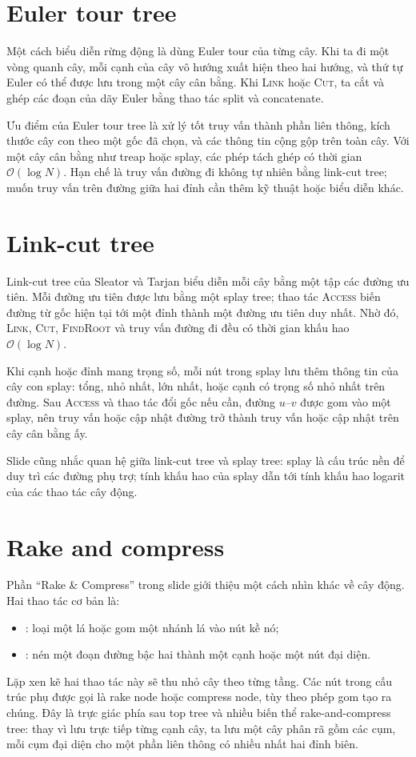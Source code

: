 \documentclass[11pt]{article}
\newcommand{\Oh}{\mathcal{O}}
\begin{document}
\section{Euler tour tree}

Một cách biểu diễn rừng động là dùng Euler tour của từng cây. Khi ta đi một
vòng quanh cây, mỗi cạnh của cây vô hướng xuất hiện theo hai hướng, và thứ tự
Euler có thể được lưu trong một cây cân bằng. Khi \textsc{Link} hoặc
\textsc{Cut}, ta cắt và ghép các đoạn của dãy Euler bằng thao tác split và
concatenate.

Ưu điểm của Euler tour tree là xử lý tốt truy vấn thành phần liên thông,
kích thước cây con theo một gốc đã chọn, và các thông tin cộng gộp trên toàn
cây. Với một cây cân bằng như treap hoặc splay, các phép tách ghép có thời
gian \(\Oh(\log N)\). Hạn chế là truy vấn đường đi không tự nhiên bằng
link-cut tree; muốn truy vấn trên đường giữa hai đỉnh cần thêm kỹ thuật hoặc
biểu diễn khác.

\section{Link-cut tree}

Link-cut tree của Sleator và Tarjan biểu diễn mỗi cây bằng một tập các đường
ưu tiên. Mỗi đường ưu tiên được lưu bằng một splay tree; thao tác
\textsc{Access} biến đường từ gốc hiện tại tới một đỉnh thành một đường ưu
tiên duy nhất. Nhờ đó, \textsc{Link}, \textsc{Cut}, \textsc{FindRoot} và truy
vấn đường đi đều có thời gian khấu hao \(\Oh(\log N)\).

Khi cạnh hoặc đỉnh mang trọng số, mỗi nút trong splay lưu thêm thông tin của
cây con splay: tổng, nhỏ nhất, lớn nhất, hoặc cạnh có trọng số nhỏ nhất trên
đường. Sau \textsc{Access} và thao tác đổi gốc nếu cần, đường \(u\)--\(v\)
được gom vào một splay, nên truy vấn hoặc cập nhật đường trở thành truy vấn
hoặc cập nhật trên cây cân bằng ấy.

Slide cũng nhắc quan hệ giữa link-cut tree và splay tree: splay là cấu trúc
nền để duy trì các đường phụ trợ; tính khấu hao của splay dẫn tới tính khấu
hao logarit của các thao tác cây động.

\section{Rake and compress}

Phần ``Rake \& Compress'' trong slide giới thiệu một cách nhìn khác về cây
động. Hai thao tác cơ bản là:
\begin{itemize}
  \item {}: loại một lá hoặc gom một nhánh lá vào nút kề nó;
  \item {}: nén một đoạn đường bậc hai thành một cạnh hoặc một
  nút đại diện.
\end{itemize}
Lặp xen kẽ hai thao tác này sẽ thu nhỏ cây theo từng tầng. Các nút trong cấu
trúc phụ được gọi là rake node hoặc compress node, tùy theo phép gom tạo ra
chúng. Đây là trực giác phía sau top tree và nhiều biến thể rake-and-compress
tree: thay vì lưu trực tiếp từng cạnh cây, ta lưu một cây phân rã gồm các
cụm, mỗi cụm đại diện cho một phần liên thông có nhiều nhất hai đỉnh biên.
\end{document}
